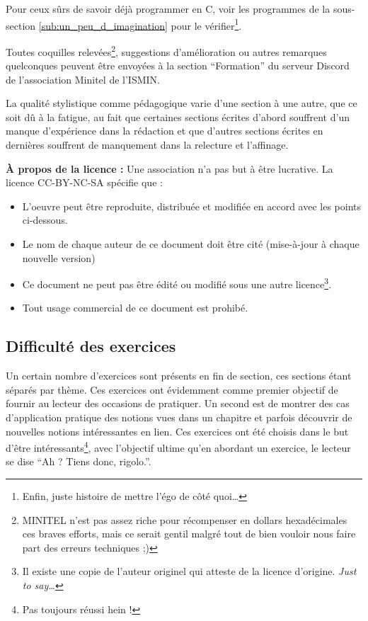 \documentclass[../main.tex]{subfiles}
\begin{document}
Pour ceux sûrs de savoir déjà programmer en C, voir les programmes de la sous-section \ref{sub:un_peu_d_imagination} pour le vérifier\footnote{Enfin, juste histoire de mettre l'égo de côté quoi\dots}.

\hrulefill

Toutes coquilles relevées\footnote{MINITEL n'est pas assez riche pour récompenser en dollars hexadécimales ces braves efforts, mais ce serait gentil malgré tout de bien vouloir nous faire part des erreurs techniques ;)}, suggestions d'amélioration ou autres remarques quelconques peuvent être envoyées à la section ``Formation'' du serveur Discord de l'association Minitel de l'ISMIN.

La qualité stylistique comme pédagogique varie d'une section à une autre, que ce soit dû à la fatigue, au fait que certaines sections écrites d'abord souffrent d'un manque d'expérience dans la rédaction et que d'autres sections écrites en dernières souffrent de manquement dans la relecture et l'affinage.

\textbf{À propos de la licence :} Une association n'a pas but à être lucrative. La licence \textsc{CC-BY-NC-SA} spécifie que :
\begin{itemize}
	\item L'oeuvre peut être reproduite, distribuée et modifiée en accord avec les points ci-dessous.
	\item Le nom de chaque auteur de ce document doit être cité (mise-à-jour à chaque nouvelle version)
	\item Ce document ne peut pas être édité ou modifié sous une autre licence\footnote{Il existe une copie de l'auteur originel qui atteste de la licence d'origine. \textit{Just to say\dots}}.
	\item Tout usage commercial de ce document est prohibé.
\end{itemize}

\hrulefill

\subsection*{Difficulté des exercices}

Un certain nombre d'exercices sont présents en fin de section, ces sections étant séparés par thème. Ces exercices ont évidemment comme premier objectif de fournir au lecteur des occasions de pratiquer. Un second est de montrer des cas d'application pratique des notions vues dans un chapitre et parfois découvrir de nouvelles notions intéressantes en lien. Ces exercices ont été choisis dans le but d'être intéressants\footnote{Pas toujours réussi hein !}, avec l'objectif ultime qu'en abordant un exercice, le lecteur se dise ``Ah ? Tiens donc, rigolo.''.
\end{document}
